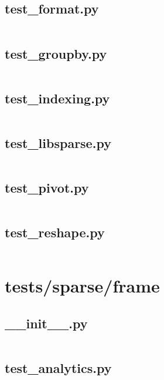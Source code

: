 \documentclass{article}
\begin{document}
\subsection{test\_format.py}
\inputminted{python}{/home/dufferzafar/dev/@clones/pandas/pandas/tests/sparse/test_format.py}
\newpage

\subsection{test\_groupby.py}
\inputminted{python}{/home/dufferzafar/dev/@clones/pandas/pandas/tests/sparse/test_groupby.py}
\newpage

\subsection{test\_indexing.py}
\inputminted{python}{/home/dufferzafar/dev/@clones/pandas/pandas/tests/sparse/test_indexing.py}
\newpage

\subsection{test\_libsparse.py}
\inputminted{python}{/home/dufferzafar/dev/@clones/pandas/pandas/tests/sparse/test_libsparse.py}
\newpage

\subsection{test\_pivot.py}
\inputminted{python}{/home/dufferzafar/dev/@clones/pandas/pandas/tests/sparse/test_pivot.py}
\newpage

\subsection{test\_reshape.py}
\inputminted{python}{/home/dufferzafar/dev/@clones/pandas/pandas/tests/sparse/test_reshape.py}
\newpage

\section{tests/sparse/frame}

\subsection{\_\_init\_\_.py}
\inputminted{python}{/home/dufferzafar/dev/@clones/pandas/pandas/tests/sparse/frame/__init__.py}
\newpage

\subsection{test\_analytics.py}
\inputminted{python}{/home/dufferzafar/dev/@clones/pandas/pandas/tests/sparse/frame/test_analytics.py}
\newpage
\end{document}
